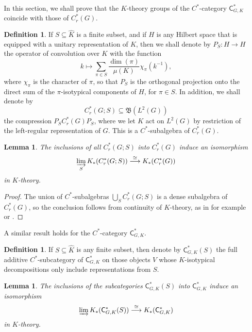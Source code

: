 \documentclass[leqno,11pt]{amsart}
\numberwithin{equation}{subsection}
\theoremstyle{plain}
\newtheorem{lemma}[equation]{Lemma}
\theoremstyle{definition}
\newtheorem{definition}[equation]{Definition}
\theoremstyle{remark}
\newcommand{\CC}{\mathsf{C}}
\begin{document}
In this section, we shall prove that the $K$-theory groups of the $C^*$-category $\CC^*_{G,K}$ coincide with those  of $C^{*}_r(G)$.



\begin{definition}
\label{def-p-s}
    If $S \subseteq \widehat{K}$ is a finite subset, and if $H$ is any Hilbert space that is equipped with a unitary representation of $K$, then we shall denote by $P_S\colon H\to H$ the 
 operator of  convolution over $K$ with the function
\[
k\longmapsto  \sum_{\pi \in S} \frac{\dim(\pi)}{\mu(K)}  \chi_{\pi}(k^{-1}), 
\]
where $\chi_\pi$ is the character of $\pi$, so that $P_S$ is the orthogonal projection onto the direct sum of the $\pi$-isotypical components of $H$, for $\pi \in S$.  In addition, we shall  denote by  
\[
C^*_r(G;S)\subseteq \mathfrak{B}(L^2 (G))
\]
the compression $P_SC^*_r(G)P_S$, where we let $K$ act on $L^2(G)$ by restriction of the left-regular representation of $G$. This is a $C^*$-subalgebra of $C^*_r(G)$. 
\end{definition}

 

\begin{lemma}
\label{lem-c-star-algebra-k-theory-as-direct-limit}
    The inclusions of all $C^*_r (G;S)$ into $C^*_r (G)$ induce an isomorphism 
\[
\varinjlim_{S} K_{*}(C^*_r(G;S)) \stackrel \cong \longrightarrow K_{*}(C^*_r(G))
\]
in $K$-theory.
\end{lemma}

\begin{proof}
The union of $C^*$-subalgebras $\bigcup_{S} C^*_{r}(G;S)$ is a dense subalgebra of $C^*_r(G)$, so the conclusion follows from continuity of $K$-theory,   as in for example 
\cite[Thm.\ 6.3.2]{RordamEtAl} or \cite[Ex.\ II.6.15]{KaroubiKTheory}.
\end{proof}



A similar result holds for the $C^*$-category $\CC^*_{G,K}$. 

\begin{definition}
   If $S \subseteq \widehat{K}$ is any finite subset, then denote by $\CC^*_{G,K}(S)$ the full additive $C^*$-subcategory of $\CC^*_{G,K}$ on those objects $V$ whose $K$-isotypical decompositions only include representations from $S$.  
\end{definition}



\begin{lemma}
\label{lem-c-star-category-k-theory-as-direct-limit}
    The inclusions of the subcategories $\CC^*_{G,K}(S)$ into $\CC^*_{G,K}$ induce an isomorphism
    \[
    \varinjlim K_{*}(\CC^*_{G,K}(S)) \stackrel \cong \longrightarrow K_{*}(\CC^*_{G,K})
    \]
    in $K$-theory.
\end{lemma}
\end{document}
